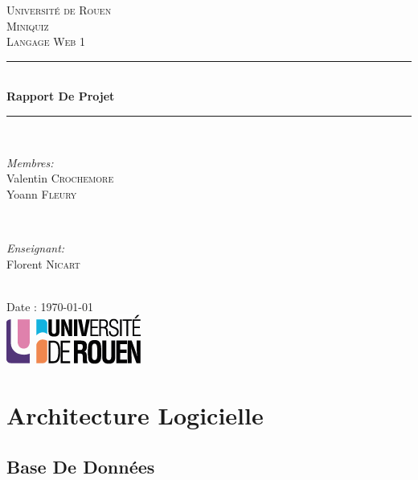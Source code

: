 \documentclass[12pt]{article}
\begin{document}
\begin{titlepage}

\newcommand{\HRule}{\rule{\linewidth}{0.5mm}}

\center

\textsc{\LARGE Université de Rouen}\\[1.5cm]
\textsc{\Large Miniquiz}\\[0.5cm]
\textsc{\large Langage Web 1}\\[0.5cm]

\HRule \\[0.4cm]
{ \huge \bfseries Rapport De Projet}\\[0.2cm]
\HRule \\[1.5cm]

  \begin{minipage}{0.4\textwidth}
    \begin{flushleft} \large
      \emph{Membres:}\\
      Valentin \textsc{Crochemore}\\
      Yoann \textsc{Fleury}
    \end{flushleft}
  \end{minipage}
  ~
  \begin{minipage}{0.4\textwidth}
    \begin{flushright} \large
      \emph{Enseignant:} \\
      Florent \textsc{Nicart}
    \end{flushright}
  \end{minipage}\\[3cm]


  {\large Date : \today}\\[3cm]

  \includegraphics{res/logo.png}\\[1cm]

  \vfill
\end{titlepage}

\newpage
\tableofcontents
\newpage

\section{Architecture Logicielle}
    \subsection{Base De Données}
\end{document}
